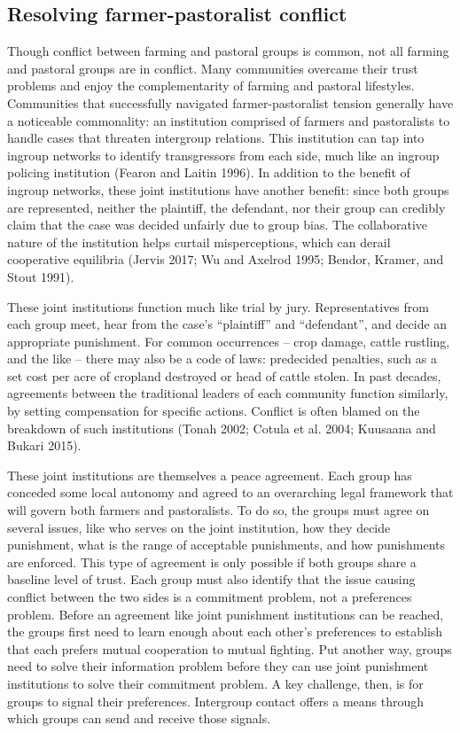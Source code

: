 \documentclass[11pt]{article}
\begin{document}
\hypertarget{resolving-farmer-pastoralist-conflict}{%
\subsection{Resolving farmer-pastoralist
conflict}\label{resolving-farmer-pastoralist-conflict}}

Though conflict between farming and pastoral groups is common, not all
farming and pastoral groups are in conflict. Many communities overcame
their trust problems and enjoy the complementarity of farming and
pastoral lifestyles. Communities that successfully navigated
farmer-pastoralist tension generally have a noticeable commonality: an
institution comprised of farmers and pastoralists to handle cases that
threaten intergroup relations. This institution can tap into ingroup
networks to identify transgressors from each side, much like an ingroup
policing institution (Fearon and Laitin 1996). In addition to the
benefit of ingroup networks, these joint institutions have another
benefit: since both groups are represented, neither the plaintiff, the
defendant, nor their group can credibly claim that the case was decided
unfairly due to group bias. The collaborative nature of the institution
helps curtail misperceptions, which can derail cooperative equilibria
(Jervis 2017; Wu and Axelrod 1995; Bendor, Kramer, and Stout 1991).

These joint institutions function much like trial by jury.
Representatives from each group meet, hear from the case's ``plaintiff''
and ``defendant'', and decide an appropriate punishment. For common
occurrences -- crop damage, cattle rustling, and the like -- there may
also be a code of laws: predecided penalties, such as a set cost per
acre of cropland destroyed or head of cattle stolen. In past decades,
agreements between the traditional leaders of each community function
similarly, by setting compensation for specific actions. Conflict is
often blamed on the breakdown of such institutions (Tonah 2002; Cotula
et al. 2004; Kuusaana and Bukari 2015).

These joint institutions are themselves a peace agreement. Each group
has conceded some local autonomy and agreed to an overarching legal
framework that will govern both farmers and pastoralists. To do so, the
groups must agree on several issues, like who serves on the joint
institution, how they decide punishment, what is the range of acceptable
punishments, and how punishments are enforced. This type of agreement is
only possible if both groups share a baseline level of trust. Each group
must also identify that the issue causing conflict between the two sides
is a commitment problem, not a preferences problem. Before an agreement
like joint punishment institutions can be reached, the groups first need
to learn enough about each other's preferences to establish that each
prefers mutual cooperation to mutual fighting. Put another way, groups
need to solve their information problem before they can use joint
punishment institutions to solve their commitment problem. A key
challenge, then, is for groups to signal their preferences. Intergroup
contact offers a means through which groups can send and receive those
signals.
\end{document}
